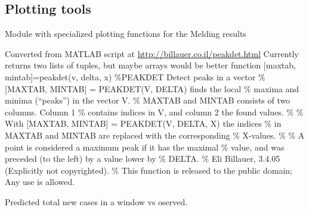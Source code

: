 \documentclass[a4paper,10pt,english]{sphinxmanual}
\begin{document}
\subsection{Plotting tools}
\label{BIP.Bayes:plotting-tools}\label{BIP.Bayes:module-BIP.Bayes.PlotMeld}
Module with specialized plotting functions for the Melding results

\begin{fulllineitems}
\label{BIP.Bayes:BIP.Bayes.PlotMeld.peakdet}
Converted from MATLAB script at \href{http://billauer.co.il/peakdet.html}{http://billauer.co.il/peakdet.html}
Currently returns two lists of tuples, but maybe arrays would be better
function {[}maxtab, mintab{]}=peakdet(v, delta, x)
\%PEAKDET Detect peaks in a vector
\% {[}MAXTAB, MINTAB{]} = PEAKDET(V, DELTA) finds the local
\% maxima and minima (``peaks'') in the vector V.
\% MAXTAB and MINTAB consists of two columns. Column 1
\% contains indices in V, and column 2 the found values.
\%
\% With {[}MAXTAB, MINTAB{]} = PEAKDET(V, DELTA, X) the indices
\% in MAXTAB and MINTAB are replaced with the corresponding
\% X-values.
\%
\% A point is considered a maximum peak if it has the maximal
\% value, and was preceded (to the left) by a value lower by
\% DELTA.
\% Eli Billauer, 3.4.05 (Explicitly not copyrighted).
\% This function is released to the public domain; Any use is allowed.

\end{fulllineitems}


\begin{fulllineitems}
\label{BIP.Bayes:BIP.Bayes.PlotMeld.pred_new_cases}
Predicted total new cases in a window vs oserved.

\end{fulllineitems}

\end{document}
